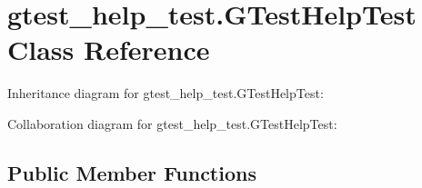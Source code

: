 \hypertarget{classgtest__help__test_1_1GTestHelpTest}{}\section{gtest\+\_\+help\+\_\+test.\+G\+Test\+Help\+Test Class Reference}
\label{classgtest__help__test_1_1GTestHelpTest}


Inheritance diagram for gtest\+\_\+help\+\_\+test.\+G\+Test\+Help\+Test\+:


Collaboration diagram for gtest\+\_\+help\+\_\+test.\+G\+Test\+Help\+Test\+:
\subsection*{Public Member Functions}
